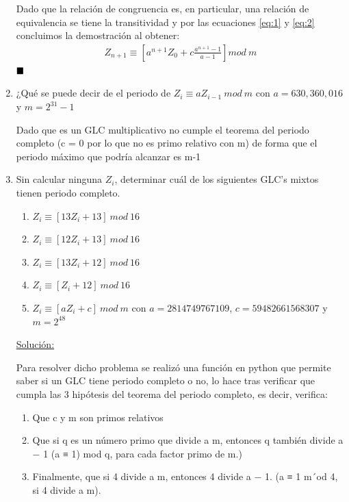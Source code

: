 \documentclass[12 pt]{article}
\renewcommand\qedsymbol{$\null\hfill\blacksquare$}
\begin{document}
\begin{enumerate}
    Dado que la relación de congruencia es, en particular, una relación de equivalencia se tiene la transitividad y por las ecuaciones \eqref{eq:1} y \eqref{eq:2} concluimos la demostración al obtener:
    \begin{align*}
        Z_{n+1} \equiv \left[a^{n+1}Z_0 + c\frac{a^{n+1} - 1}{a - 1} \right] mod \ m 
    \end{align*} 
    \qedsymbol
    
    \newpage
    
    \item¿Qué se puede decir de el periodo de $Z_i \equiv aZ_{i-1}\ mod \ m$  con $a = 630,360,016$ y $m = 2^{31} -1$
    
    Dado que es un GLC multiplicativo no cumple el teorema del periodo completo (c = 0 por lo que no es primo relativo con m) de forma que el periodo máximo que podría alcanzar es m-1
    
    \newpage
    
    \item Sin calcular ninguna $Z_i$, determinar cuál de los siguientes GLC’s mixtos tienen periodo completo.
    
    \begin{enumerate}[label=(\alph*)]
        \item $Z_i \equiv [13Z_i + 13] \ mod \ 16$
        \item $Z_i \equiv [12Z_i + 13] \ mod \ 16$
        \item $Z_i \equiv [13Z_i + 12] \ mod \ 16$
        \item $Z_i \equiv [Z_i + 12] \ mod \ 16$
        \item $Z_i \equiv [aZ_i + c] \ mod \ m$ con $a = 2814749767109$, $c = 59482661568307$ y $m =2^{48}$
        
    \end{enumerate}
    
    \underline{Solución:}
    
    Para resolver dicho problema se realizó una función en python que permite saber si un GLC tiene periodo completo o no, lo hace tras verificar que cumpla las 3 hipótesis del teorema del periodo completo, es decir, verifica:
    
    \begin{enumerate}
        \item Que c y m son primos relativos
        \item Que si q es un número primo que divide a m, entonces q también divide a − 1 (a ≡ 1)
              mod q, para cada factor primo de m.)
        \item Finalmente, que si 4 divide a m, entonces 4 divide a − 1. (a ≡ 1 m´od 4, si 4 divide a m).
    \end{enumerate}    


\end{enumerate}
\end{document}
